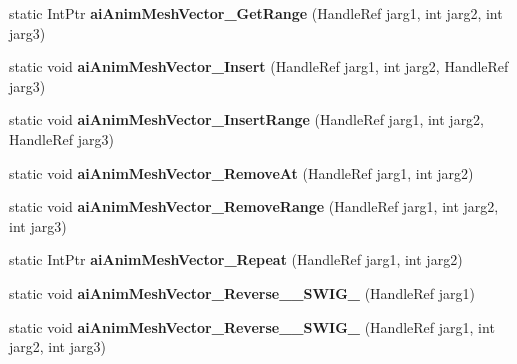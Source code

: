 \begin{DoxyCompactItemize}
\item 
\hypertarget{class_assimp_p_i_n_v_o_k_e_a8c3390c10bb9ae19aa2be2cc613d95f0}{static Int\+Ptr {\bfseries ai\+Anim\+Mesh\+Vector\+\_\+\+Get\+Range} (Handle\+Ref jarg1, int jarg2, int jarg3)}\label{class_assimp_p_i_n_v_o_k_e_a8c3390c10bb9ae19aa2be2cc613d95f0}

\item 
\hypertarget{class_assimp_p_i_n_v_o_k_e_ad749ded55330aa6e2c47c7b426b6e5aa}{static void {\bfseries ai\+Anim\+Mesh\+Vector\+\_\+\+Insert} (Handle\+Ref jarg1, int jarg2, Handle\+Ref jarg3)}\label{class_assimp_p_i_n_v_o_k_e_ad749ded55330aa6e2c47c7b426b6e5aa}

\item 
\hypertarget{class_assimp_p_i_n_v_o_k_e_a6e79e7751f910b90cb0c777ede632930}{static void {\bfseries ai\+Anim\+Mesh\+Vector\+\_\+\+Insert\+Range} (Handle\+Ref jarg1, int jarg2, Handle\+Ref jarg3)}\label{class_assimp_p_i_n_v_o_k_e_a6e79e7751f910b90cb0c777ede632930}

\item 
\hypertarget{class_assimp_p_i_n_v_o_k_e_a9736b36af7d8952b6f88dc4223fd205d}{static void {\bfseries ai\+Anim\+Mesh\+Vector\+\_\+\+Remove\+At} (Handle\+Ref jarg1, int jarg2)}\label{class_assimp_p_i_n_v_o_k_e_a9736b36af7d8952b6f88dc4223fd205d}

\item 
\hypertarget{class_assimp_p_i_n_v_o_k_e_a601650cade4807af20a8aa0c83a02eb5}{static void {\bfseries ai\+Anim\+Mesh\+Vector\+\_\+\+Remove\+Range} (Handle\+Ref jarg1, int jarg2, int jarg3)}\label{class_assimp_p_i_n_v_o_k_e_a601650cade4807af20a8aa0c83a02eb5}

\item 
\hypertarget{class_assimp_p_i_n_v_o_k_e_a3ee9f0aca019669dbed24e0d3df771f7}{static Int\+Ptr {\bfseries ai\+Anim\+Mesh\+Vector\+\_\+\+Repeat} (Handle\+Ref jarg1, int jarg2)}\label{class_assimp_p_i_n_v_o_k_e_a3ee9f0aca019669dbed24e0d3df771f7}

\item 
\hypertarget{class_assimp_p_i_n_v_o_k_e_accc9560f88c40672bd9b683c1191b565}{static void {\bfseries ai\+Anim\+Mesh\+Vector\+\_\+\+Reverse\+\_\+\+\_\+\+S\+W\+I\+G\+\_} (Handle\+Ref jarg1)}\label{class_assimp_p_i_n_v_o_k_e_accc9560f88c40672bd9b683c1191b565}

\item 
\hypertarget{class_assimp_p_i_n_v_o_k_e_a14859be1a0a4e56eb035dc22f8a4e014}{static void {\bfseries ai\+Anim\+Mesh\+Vector\+\_\+\+Reverse\+\_\+\+\_\+\+S\+W\+I\+G\+\_} (Handle\+Ref jarg1, int jarg2, int jarg3)}\label{class_assimp_p_i_n_v_o_k_e_a14859be1a0a4e56eb035dc22f8a4e014}


\end{DoxyCompactItemize}
